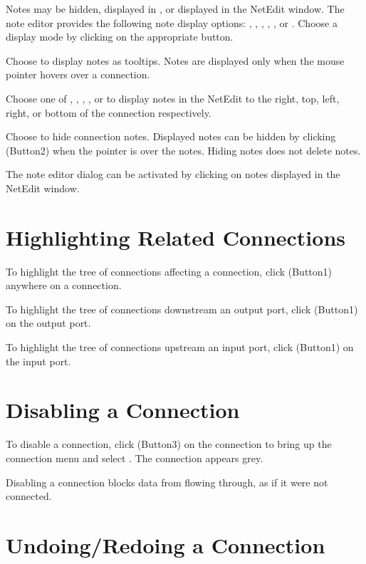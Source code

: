 Notes may be hidden, displayed in , or displayed in the
NetEdit window.  The note editor provides the following note display
options: , , ,
, , or .  Choose a
display mode by clicking  on the appropriate button.

Choose  to display notes as tooltips.  Notes are
displayed only when the mouse pointer hovers over a connection.

Choose one of , , ,
, or  to display notes in the
NetEdit to the right, top, left, right, or bottom of the connection
respectively. 

Choose  to hide connection notes.  Displayed notes can be
hidden by clicking \keyboard(Button2) when the pointer is over the
notes.  Hiding notes does not delete notes.

The note editor dialog can be activated by clicking 
on notes displayed in the NetEdit window.

\section{Highlighting Related Connections}
\label{sec:highlightconnect}

To highlight the tree of connections affecting a connection, click
\keyboard(Button1) anywhere on a connection.

To highlight the tree of connections downstream an output port,
click \keyboard(Button1) on the output port.

To highlight the tree of connections upstream an input port,
click \keyboard(Button1) on the input port.

\section{Disabling a Connection}
\label{sec:disableconnect}

To disable a connection, click \keyboard(Button3) on the connection to
bring up the connection menu and select . The
connection appears grey.

Disabling a connection blocks data from flowing through, as if it were
not connected.

\section{Undoing/Redoing a Connection}
\label{sec:undomod}

